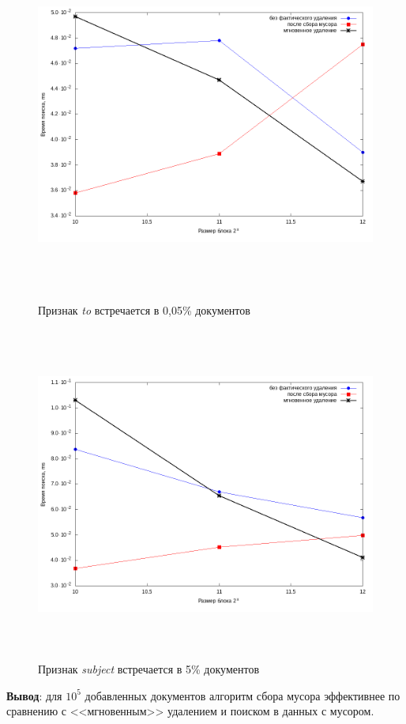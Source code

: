 \begin{figure}[H]
\includegraphics[width=\linewidth, height=11cm]{fig/limit_1/1e5/to.png}
\caption{Признак \textit{to} встречается в 0,05\% документов}
\includegraphics[width=\linewidth, height=11cm]{fig/limit_1/1e5/subject.png}
\caption{Признак \textit{subject} встречается в 5\% документов}
\end{figure}


\textbf{Вывод}: для $10^5$ добавленных документов алгоритм сбора мусора эффективнее
по сравнению с <<мгновенным>> удалением и поиском в данных с мусором.

